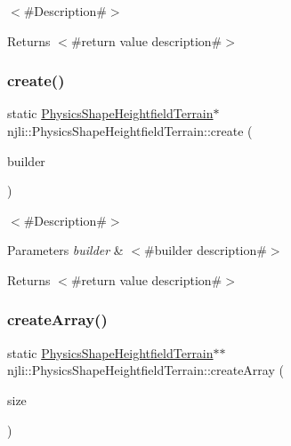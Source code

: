 $<$\#\+Description\#$>$

\begin{DoxyReturn}{Returns}
$<$\#return value description\#$>$ 
\end{DoxyReturn}
\mbox{\label{classnjli_1_1_physics_shape_heightfield_terrain_a1427cac41a5689ea2acf85fcd9fe3845}} 
\subsubsection{\texorpdfstring{create()}{create()}\hspace{0.1cm}{\footnotesize\ttfamily [2/2]}}
{\footnotesize\ttfamily static \mbox{\hyperlink{classnjli_1_1_physics_shape_heightfield_terrain}{Physics\+Shape\+Heightfield\+Terrain}}$\ast$ njli\+::\+Physics\+Shape\+Heightfield\+Terrain\+::create (\begin{DoxyParamCaption}\item[{const \mbox{\hyperlink{classnjli_1_1_physics_shape_heightfield_terrain_builder}{Physics\+Shape\+Heightfield\+Terrain\+Builder}} \&}]{builder }\end{DoxyParamCaption})\hspace{0.3cm}{\ttfamily [static]}}

$<$\#\+Description\#$>$


\begin{DoxyParams}{Parameters}
{\em builder} & $<$\#builder description\#$>$\\
\hline
\end{DoxyParams}
\begin{DoxyReturn}{Returns}
$<$\#return value description\#$>$ 
\end{DoxyReturn}
\mbox{\label{classnjli_1_1_physics_shape_heightfield_terrain_a8d02dc48f9dd364228890b24691f3632}} 
\subsubsection{\texorpdfstring{create\+Array()}{createArray()}}
{\footnotesize\ttfamily static \mbox{\hyperlink{classnjli_1_1_physics_shape_heightfield_terrain}{Physics\+Shape\+Heightfield\+Terrain}}$\ast$$\ast$ njli\+::\+Physics\+Shape\+Heightfield\+Terrain\+::create\+Array (\begin{DoxyParamCaption}\item[{const \mbox{\hyperlink{_util_8h_a10e94b422ef0c20dcdec20d31a1f5049}{u32}}}]{size }\end{DoxyParamCaption})\hspace{0.3cm}{\ttfamily [static]}}

